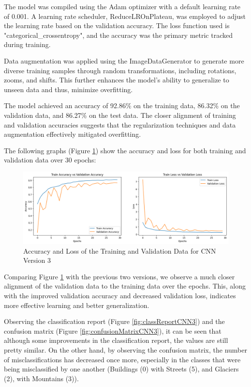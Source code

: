 \documentclass[conference]{IEEEtran}
\begin{document}
The model was compiled using the Adam optimizer with a default learning rate of 0.001. A learning rate scheduler, ReduceLROnPlateau, was employed to adjust the learning rate based on the validation accuracy. The loss function used is "categorical\_crossentropy", and the accuracy was the primary metric tracked during training.

Data augmentation was applied using the ImageDataGenerator to generate more diverse training samples through random transformations, including rotations, zooms, and shifts. This further enhances the model's ability to generalize to unseen data and thus, minimize overfitting.

The model achieved an accuracy of 92.86\% on the training data, 86.32\% on the validation data, and 86.27\% on the test data. The closer alignment of training and validation accuracies suggests that the regularization techniques and data augmentation effectively mitigated overfitting.

The following graphs (Figure \ref{fig:accuracyLossCNN3}) show the accuracy and loss for both training and validation data over 30 epochs:

\begin{figure}[H]
    \centering
    \includegraphics[width=1\linewidth]{images/acc_loss_cnn_3.png}
    \caption{Accuracy and Loss of the Training and Validation Data for CNN Version 3}
    \label{fig:accuracyLossCNN3}
\end{figure}

Comparing Figure \ref{fig:accuracyLossCNN3} with the previous two versions, we observe a much closer alignment of the validation data to the training data over the epochs. This, along with the improved validation accuracy and decreased validation loss, indicates more effective learning and better generalization.

Observing the classification report (Figure \ref{fig:classReportCNN3}) and the confusion matrix (Figure \ref{fig:confusionMatrixCNN3}), it can be seen that although some improvements in the classification report, the values are still pretty similar. On the other hand, by observing the confusion matrix, the number of misclassifications has decreased once more, especially in the classes that were being misclassified by one another (Buildings (0) with Streets (5), and Glaciers (2), with Mountains (3)).
\end{document}
